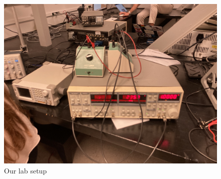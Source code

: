 \documentclass[twocolumn]{article}\usepackage[english]{babel}
\begin{document}
\begin{figure}
  \includegraphics[width=\linewidth]{images/lab/setup.JPEG}
  \caption{Our lab setup}
  \label{fig:LAB_SETUP}
\end{figure}
\end{document}
